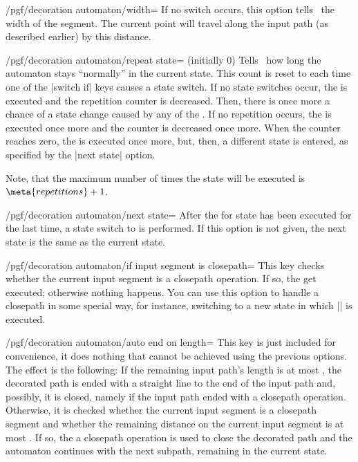 \begin{command}{\pgfdeclaredecoration{}}
\begin{command}{\state{}}
\begin{key}{/pgf/decoration automaton/width=}
      If no switch occurs, this option tells \pgfname\ the width of
      the segment. The current point will travel along the input path
      (as described earlier)   by this distance.
    \end{key}
    \begin{key}{/pgf/decoration automaton/repeat state= (initially 0)}
      Tells \pgfname\ how long the automaton stays ``normally'' in the
      current state. This count is reset to  each
      time one of the |switch if| keys causes a state switch. If no
      state switches occur, the  is executed and the
      repetition counter is decreased. Then, there is once more a
      chance of a state change caused by any of the . If
      no repetition occurs, the  is executed
      once more and the counter is decreased once more. When the
      counter reaches zero, the  is executed once more,
      but, then, a different state is entered, as specified by the
      |next state| option.

      Note, that the maximum number of times the state will be executed
      is $\meta{repetitions}+1$.
    \end{key}
    \begin{key}{/pgf/decoration automaton/next state=}
      After the  for state has been executed for the last
      time, a state switch to  is performed. If this
      option is not given, the next state is the same as the current state.
    \end{key}

    \begin{key}{/pgf/decoration automaton/if input segment is closepath=}
      This key checks whether the current input segment is a closepath
      operation. If so, the  get executed; otherwise
      nothing happens. You can use this option to handle a closepath
      in some special way, for instance, switching to a new state in
      which |\pgfpathclose| is executed.
    \end{key}

    \begin{key}{/pgf/decoration automaton/auto end on length=}
      This key is just included for convenience, it does nothing that
      cannot be achieved using the previous options. The effect is the
      following: If the remaining input path's length is at most
      , the decorated path is ended with a straight
      line to the end of the input path and, possibly, it is closed,
      namely if the input path ended with a closepath
      operation. Otherwise, it is checked whether the current input
      segment is a closepath segment and whether the remaining
      distance on the current input segment is at most
      . If so, the a closepath operation is used to
      close the decorated path and the automaton continues with the
      next subpath, remaining in the current state.


\end{key}
\end{command}
\end{command}
